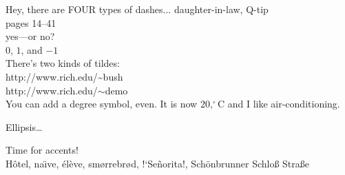\documentclass[10pt,letterpaper,notitlepage,oneside]{article}
\begin{document}
Hey, there are FOUR types of dashes...
daughter-in-law, Q-tip\\
pages 14--41\\
yes---or no?\\
$0$, $1$, and $-1$\\

There's two kinds of tildes:\\
http://www.rich.edu/\~{}bush \\  %
http://www.rich.edu/$\sim$demo \\  %

You can add a degree symbol, even.  It is now $20,^{\circ}\mathrm{C}$ and
I like air-conditioning.

Ellipsis\ldots

Time for accents!\\
H\^o{}tel, na\"\i ve, \'el\`eve, sm\o rrebr\o d, !`Se\~norita!,
Sch\"onbrunner Schlo\ss{} Stra\ss e
\end{document}
